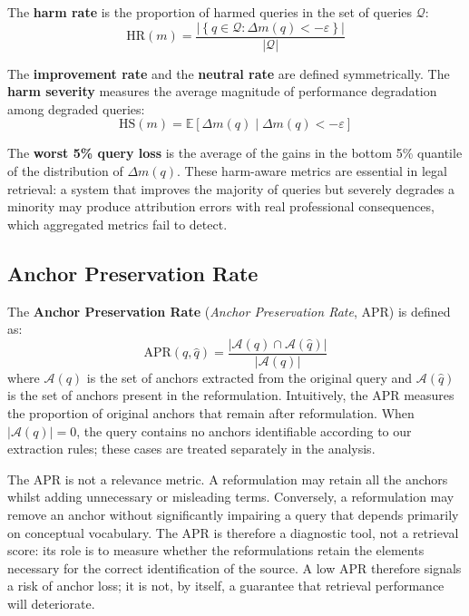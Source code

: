 \documentclass[a4paper,fleqn]{cas-dc}
\begin{document}
The \textbf{harm rate} is the proportion of
harmed queries in the set of queries $\mathcal{Q}$:
\begin{equation}
\text{HR}(m) =
    \frac{\left|\left\{q \in \mathcal{Q} :
    \Delta m(q) < -\varepsilon\right\}\right|}{|\mathcal{Q}|}
\end{equation}
 
The \textbf{improvement rate} and the \textbf{neutral rate} are defined
symmetrically. The \textbf{harm severity} measures
the average magnitude of performance degradation among degraded queries:
\begin{equation}
    \text{HS}(m) =
    \mathbb{E}\left[\Delta m(q) \mid \Delta m(q) < -\varepsilon\right]
\end{equation}
 
The \textbf{worst 5\% query loss} is
the average of the gains in the bottom 5\% quantile of the distribution of
$\Delta m(q)$. These harm-aware metrics are essential in legal
retrieval: a system that improves the majority of queries but severely degrades
a minority may produce attribution errors with real professional consequences,
which aggregated metrics fail to detect.
 
\subsection{Anchor Preservation Rate}
\label{sec:problem-apr}
 
The \textbf{Anchor Preservation Rate} (\textit{Anchor Preservation Rate},
APR) is defined as:
\begin{equation}
    \text{APR}(q, \hat{q}) =
   \frac{\left|\mathcal{A}(q) \cap \mathcal{A}(\hat{q})\right|}
     {\left|\mathcal{A}(q)\right|}
\end{equation}
where $\mathcal{A}(q)$ is the set of anchors extracted from the original query
and $\mathcal{A}(\hat{q})$ is the set of anchors present in the reformulation.
Intuitively, the APR measures the proportion of original anchors that remain
after reformulation. When $|\mathcal{A}(q)| = 0$, the query contains no
anchors identifiable according to our extraction rules; these cases are treated
separately in the analysis.
 
The APR is not a relevance metric. A reformulation may retain
all the anchors whilst adding unnecessary or misleading terms. Conversely,
a reformulation may remove an anchor without significantly impairing a query that
depends primarily on conceptual vocabulary. The APR is therefore a diagnostic tool,
not a retrieval score: its role is to measure whether the reformulations
retain the elements necessary for the correct identification of the source. A
low APR therefore signals a risk of anchor loss; it is not, by
itself, a guarantee that retrieval performance will deteriorate.
 
\end{document}
